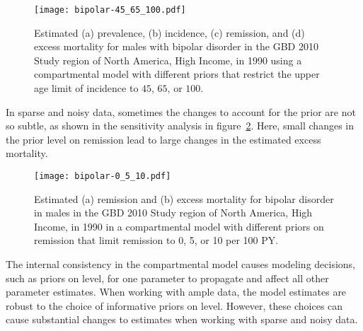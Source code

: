     \begin{figure}[h]
        \begin{center}
            \texttt{[image: bipolar-45\_65\_100.pdf]}
            \caption{Estimated (a) prevalence, (b) incidence, (c) remission, and
              (d) excess mortality for males with bipolar
              disorder in the GBD 2010 Study region of North America, High Income,
              in 1990 using a compartmental model with
              different priors that restrict the upper age limit of
              incidence to $45$, $65$, or $100$.}
            \label{fig:app-bipolar onset}
        \end{center}
    \end{figure}

In sparse and noisy data, sometimes the changes to account for the prior
are not so subtle, as shown in the sensitivity analysis in
figure~\ref{fig:app-bipolar remission}.  Here, small changes in the
prior level on remission lead to large changes in the estimated excess mortality.

    \begin{figure}[h]
        \begin{center}
            \texttt{[image: bipolar-0\_5\_10.pdf]}
            \caption{Estimated (a) remission and (b) excess
              mortality for bipolar disorder in
              males in the GBD 2010 Study region of North America, High Income,
              in 1990 in a compartmental model
              with different priors on remission that limit remission
              to 0, 5, or 10 per 100 PY.}
            \label{fig:app-bipolar remission}
        \end{center}
    \end{figure}

The internal consistency in the compartmental model causes modeling
decisions, such as priors on level, for one parameter to propagate and
affect all other parameter estimates.  When working with ample data,
the model estimates are robust to the choice of informative priors on
level.  However, these choices can cause substantial changes to
estimates when working with sparse and noisy data.




